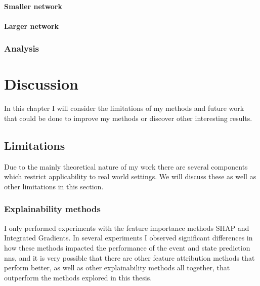 \documentclass[UKenglish]{uiomasterthesis}
\begin{document}
\subsubsection{Smaller network}


\subsubsection{Larger network}


\subsection{Analysis}



\chapter{Discussion}
\label{chap:disc}
In this chapter I will consider the limitations of my methods and future work that could be done to improve my methods or discover other interesting results.

\section{Limitations}
Due to the mainly theoretical nature of my work there are several components which restrict applicability to real world settings. We will discuss these as well as other limitations in this section.

\subsection{Explainability methods}
I only performed experiments with the feature importance methods SHAP and Integrated Gradients. In several experiments I observed significant differences in how these methods impacted the performance of the event and state prediction \acp{nn}, and it is very possible that there are other feature attribution methods that perform better, as well as other explainability methods all together, that outperform the methods explored in this thesis.
\end{document}
